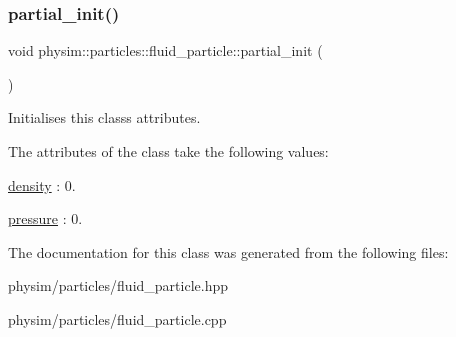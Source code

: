\mbox{\label{classphysim_1_1particles_1_1fluid__particle_a5860aec6ef23bd4a700df26eb6b7b2f7}} 
\subsubsection{\texorpdfstring{partial\+\_\+init()}{partial\_init()}}
{\footnotesize\ttfamily void physim\+::particles\+::fluid\+\_\+particle\+::partial\+\_\+init (\begin{DoxyParamCaption}{ }\end{DoxyParamCaption})\hspace{0.3cm}{\ttfamily [private]}}



Initialises this class\textquotesingle{}s attributes. 

The attributes of the class take the following values\+:
\begin{DoxyItemize}
\item \hyperlink{classphysim_1_1particles_1_1fluid__particle_a0664c7d411aae32890f6fd359c74f2bc}{density} \+: 0.
\item \hyperlink{classphysim_1_1particles_1_1fluid__particle_a2829dc6a83026e0854dd0ef4064f19b6}{pressure} \+: 0. 
\end{DoxyItemize}

The documentation for this class was generated from the following files\+:\begin{DoxyCompactItemize}
\item 
physim/particles/fluid\+\_\+particle.\+hpp\item 
physim/particles/fluid\+\_\+particle.\+cpp\end{DoxyCompactItemize}
